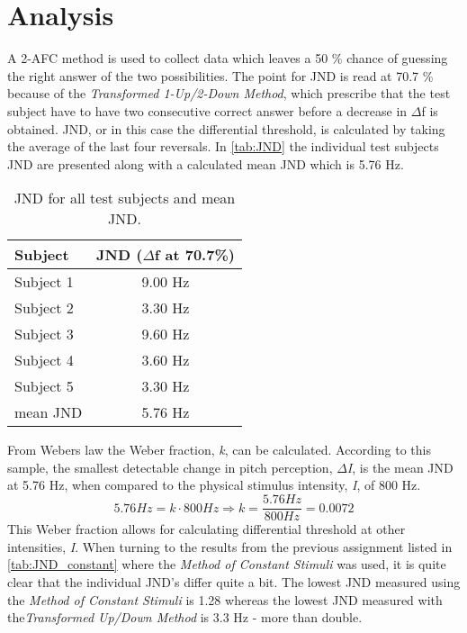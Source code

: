 \section*{Analysis}
\label{analysis}
%
A 2-AFC method is used to collect data which leaves a 50 \% chance of guessing the right answer of the two possibilities. The point for JND is read at 70.7 \% because of the \textit{Transformed 1-Up/2-Down Method}, which prescribe that the test subject have to have two consecutive correct answer before a decrease in $\Delta$f is obtained.\blankline
%
JND, or in this case the differential threshold, is calculated by taking the average of the last four reversals. In \autoref{tab:JND} the individual test subjects JND are presented along with a calculated mean JND which is 5.76 Hz. 
%
\begin{table}[H]
	\centering
	\begin{tabular}{l|c}
		Subject     & JND ($\Delta$f at 70.7\%) \\\hline
		Subject 1   & 9.00 Hz          \\\hline
		Subject 2   & 3.30 Hz            \\\hline
		Subject 3   & 9.60 Hz              \\\hline
		Subject 4   & 3.60 Hz            \\\hline
		Subject 5   & 3.30 Hz               \\\hline
		mean JND &    5.76 Hz   
	\end{tabular}
	\caption{JND for all test subjects and mean JND.}
	\label{tab:JND}         
\end{table}
\noindent
%
From Webers law the Weber fraction, \textit{k}, can be calculated. According to this sample, the smallest detectable change in pitch perception, \textit{$\Delta$I}, is the mean JND at 5.76 Hz, when compared to the physical stimulus intensity, \textit{I}, of 800 Hz.
% 
\begin{equation}
5.76 Hz = k \cdot 800 Hz \Rightarrow k = \frac{5.76 Hz}{800 Hz} = 0.0072
\end{equation}
%
This Weber fraction allows for calculating differential threshold at other intensities, \textit{I}.\blankline 
%
When turning to the results from the previous assignment listed in \autoref{tab:JND_constant} where the \textit{Method of Constant Stimuli} was used, it is quite clear that the individual JND's differ quite a bit. The lowest JND measured using the \textit{Method of Constant Stimuli} is 1.28 whereas the lowest JND measured with the\textit{Transformed Up/Down Method} is 3.3 Hz - more than double. 

